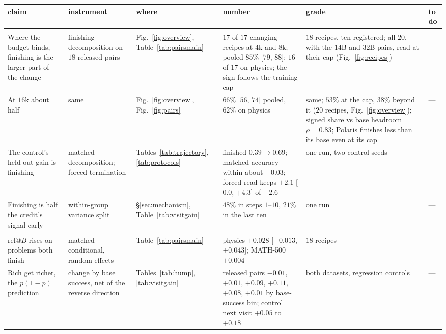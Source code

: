 \begin{table}[!tp]
\centering\scriptsize\setlength{\tabcolsep}{3pt}\renewcommand{\arraystretch}{0.84}
\begin{tabular}{>{\raggedright\arraybackslash}p{2.9cm}>{\raggedright\arraybackslash}p{2.6cm}>{\raggedright\arraybackslash}p{2.1cm}>{\raggedright\arraybackslash}p{3.8cm}>{\raggedright\arraybackslash}p{2.0cm}>{\raggedright\arraybackslash}p{2.6cm}}
\toprule
claim & instrument & where & number & grade & to do \\
\midrule
\multicolumn{6}{l}{\textit{Finishing}} \\
Where the budget binds, finishing is the larger part of the change & finishing decomposition on $18$ released pairs & Fig.~\ref{fig:overview}, Table~\ref{tab:pairsmain} & $17$ of $17$ changing recipes at $4$k and $8$k; pooled $85\%$ [$79$, $88$]; $16$ of $17$ on physics; the sign follows the training cap & $18$ recipes, ten registered; all $20$, with the $14$B and $32$B pairs, read at their cap (Fig.~\ref{fig:recipes}) & --- \\
At $16$k about half & same & Fig.~\ref{fig:overview}, Fig.~\ref{fig:pairs} & $66\%$ [$56$, $74$] pooled, $62\%$ on physics & same; $53\%$ at the cap, $38\%$ beyond it ($20$ recipes, Fig.~\ref{fig:overview}); signed share vs base headroom $\rho{=}0.83$; Polaris finishes less than its base even at its cap & --- \\
The control's held-out gain is finishing & matched decomposition; forced termination & Tables~\ref{tab:trajectory}, \ref{tab:protocols} & finished $0.39\to0.69$; matched accuracy within about $\pm0.03$; forced read keeps $+2.1$ [$0.0$, $+4.3$] of $+2.6$ & one run, two control seeds & --- \\
Finishing is half the credit's signal early & within-group variance split & \S\ref{sec:mechanism}, Table~\ref{tab:visitgain} & $48\%$ in steps $1$--$10$, $21\%$ in the last ten & one run & --- \\
\midrule
\multicolumn{6}{l}{\textit{Reliability}} \\
rel@$B$ rises on problems both finish & matched conditional, random effects & Table~\ref{tab:pairsmain} & physics $+0.028$ [$+0.013$, $+0.043$]; MATH-500 $+0.004$ & $18$ recipes & --- \\
Rich get richer, the $p(1-p)$ prediction & change by base success, net of the reverse direction & Tables~\ref{tab:hump}, \ref{tab:visitgain} & released pairs $-0.01$, $+0.01$, $+0.09$, $+0.11$, $+0.08$, $+0.01$ by base-success bin; control next visit $+0.05$ to $+0.18$ & both datasets, regression controls & --- \\

\end{tabular}
\end{table}
